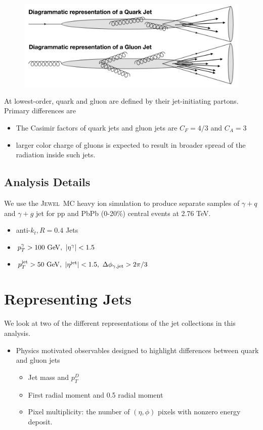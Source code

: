 \documentclass[final]{beamer}
\newcommand{\jw}{\textsc{Jewel}~}
\begin{document}
\begin{frame}[t]
\begin{multicols}{3}
	\begin{figure}[h]
	  \centering
	  \includegraphics[width=0.9\columnwidth]{Figures/q_g_jet_quenching}
	  \label{fig:qgjetdrawing}
	\end{figure}
	
	At lowest-order, quark and gluon are defined by their jet-initiating partons. Primary differences are 
	\begin{itemize}
	\item The Casimir factors of quark jets and gluon jets are $C_F = 4/3$ and $C_A=3$ 
	\item larger color charge of gluons is expected to result in broader spread of the radiation inside such jets. 
	\end{itemize} 
	
	\subsection{Analysis Details}	
	
	We use the \jw MC heavy ion simulation to produce separate samples of $\gamma+q$ and $\gamma+g$ jet for pp and PbPb (0-20\%) central events at 2.76 TeV. 
	\begin{itemize}
	\item anti-$k_t, R = 0.4$ Jets
	\item $ p^{\gamma}_T > 100~{\rm GeV}, ~|\eta^{\rm \gamma}|<1.5$
	\item $p^{\rm jet}_T > 50~{\rm GeV}, ~ |\eta^{\rm jet}|<1.5, ~\Delta \phi_{\gamma, {\rm jet}} > 2\pi/3 $
	\end{itemize} 
	
\section{Representing Jets}

	We look at two of the different representations of the jet collections in this analysis. 
	
	\begin{itemize}
	\item {\color{green} Physics motivated observables} designed to highlight differences between quark and gluon jets  
		\begin{itemize}
		\item Jet mass and $p_{T}^{D}$
	        \item First radial moment and 0.5 radial moment
       		\item Pixel multiplicity: the number of $(\eta,\phi)$ pixels with nonzero energy deposit.
		\end{itemize}
	\end{itemize}
			

\end{multicols}
\end{frame}
\end{document}
